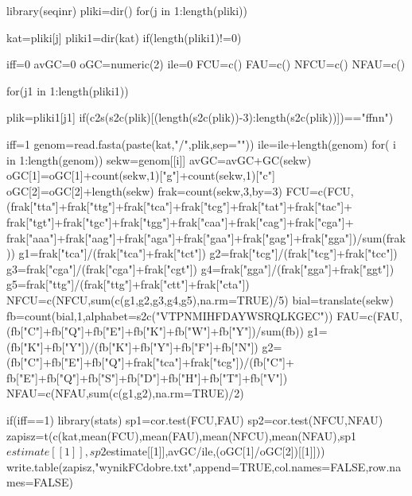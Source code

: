 library(seqinr)
pliki=dir()
for(j in 1:length(pliki))
{
kat=pliki[j]
pliki1=dir(kat)
if(length(pliki1)!=0)
{

iff=0
avGC=0
oGC=numeric(2)
ile=0
FCU=c()
FAU=c()
NFCU=c()
NFAU=c()

for(j1 in 1:length(pliki1))
{
plik=pliki1[j1]
if(c2s(s2c(plik)[(length(s2c(plik))-3):length(s2c(plik))])=="ffnn")
{

iff=1
genom=read.fasta(paste(kat,"/",plik,sep=""))
ile=ile+length(genom)
for( i in 1:length(genom))
{
sekw=genom[[i]]
avGC=avGC+GC(sekw)
oGC[1]=oGC[1]+count(sekw,1)["g"]+count(sekw,1)["c"]
oGC[2]=oGC[2]+length(sekw)
frak=count(sekw,3,by=3)
FCU=c(FCU,(frak["tta"]+frak["ttg"]+frak["tca"]+frak["tcg"]+frak["tat"]+frak["tac"]+
frak["tgt"]+frak["tgc"]+frak["tgg"]+frak["caa"]+frak["cag"]+frak["cga"]+
frak["aaa"]+frak["aag"]+frak["aga"]+frak["gaa"]+frak["gag"]+frak["gga"])/sum(frak))
g1=frak["tca"]/(frak["tca"]+frak["tct"])
g2=frak["tcg"]/(frak["tcg"]+frak["tcc"])
g3=frak["cga"]/(frak["cga"]+frak["cgt"])
g4=frak["gga"]/(frak["gga"]+frak["ggt"])
g5=frak["ttg"]/(frak["ttg"]+frak["ctt"]+frak["cta"])
NFCU=c(NFCU,sum(c(g1,g2,g3,g4,g5),na.rm=TRUE)/5)
bial=translate(sekw)
fb=count(bial,1,alphabet=s2c("VTPNMIHFDAYWSRQLKGEC"))
FAU=c(FAU,(fb["C"]+fb["Q"]+fb["E"]+fb["K"]+fb["W"]+fb["Y"])/sum(fb))
g1=(fb["K"]+fb["Y"])/(fb["K"]+fb["Y"]+fb["F"]+fb["N"])
g2=(fb["C"]+fb["E"]+fb["Q"]+frak["tca"]+frak["tcg"])/(fb["C"]+
 fb["E"]+fb["Q"]+fb["S"]+fb["D"]+fb["H"]+fb["T"]+fb["V"])
NFAU=c(NFAU,sum(c(g1,g2),na.rm=TRUE)/2)
}

}
}
if(iff==1)
{
library(stats)
sp1=cor.test(FCU,FAU)
sp2=cor.test(NFCU,NFAU)
zapisz=t(c(kat,mean(FCU),mean(FAU),mean(NFCU),mean(NFAU),sp1$estimate[[1]],sp2$estimate[[1]],avGC/ile,(oGC[1]/oGC[2])[[1]]))
write.table(zapisz,"wynikFCdobre.txt",append=TRUE,col.names=FALSE,row.names=FALSE)
}
}
}

